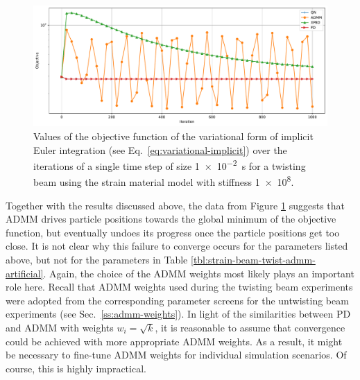 \begin{figure}[H]
    \includegraphics[width=\textwidth]{figures/strain_beam_twist_objectives_admm_failure.pdf}
    \caption{Values of the objective function of the variational form of implicit Euler integration (see Eq.\ \ref{eq:variational-implicit}) over the iterations of 
        a single time step of size \SI{1e-2}{\second} for a twisting beam using the strain material model with stiffness \num{1e8}.}
    \label{fig:strain-beam-twist-objectives-admm-failure}
\end{figure}

Together with the results discussed above, the data from Figure \ref{fig:strain-beam-twist-objectives-admm-failure} suggests that ADMM drives particle 
positions towards the global minimum of the objective function, but eventually undoes its progress once the particle positions get too close. 
It is not clear why this failure to converge occurs for the parameters listed above, but not for the parameters in Table \ref{tbl:strain-beam-twist-admm-artificial}. 
Again, the choice 
of the ADMM weights most likely plays an important role here. 
Recall that ADMM weights used during the twisting beam experiments were adopted from the corresponding 
parameter screens for the untwisting beam experiments (see Sec.\ \ref{ss:admm-weights}).  
In light of the similarities between PD and ADMM with weights $w_i = \sqrt{k}$, 
it is reasonable to assume that convergence could be achieved with more appropriate ADMM weights.
As a result, it might be necessary to fine-tune ADMM weights for 
individual simulation scenarios. Of course, this is highly impractical.

